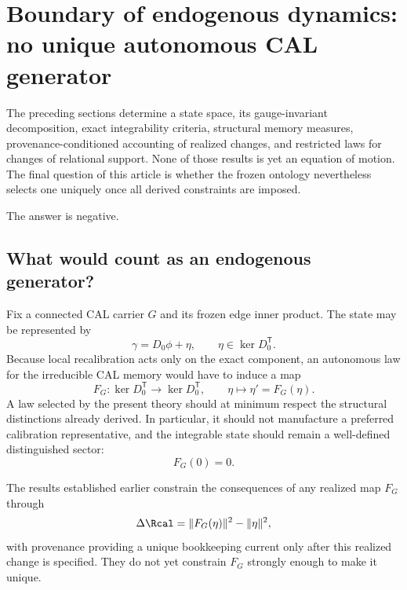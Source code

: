 
\section{Boundary of endogenous dynamics: no unique autonomous CAL generator}
\label{sec:stop}

The preceding sections determine a state space, its gauge-invariant decomposition, exact integrability criteria, structural memory measures, provenance-conditioned accounting of realized changes, and restricted laws for changes of relational support. None of those results is yet an equation of motion. The final question of this article is whether the frozen ontology nevertheless selects one uniquely once all derived constraints are imposed.

The answer is negative.

\subsection{What would count as an endogenous generator?}

Fix a connected CAL carrier $G$ and its frozen edge inner product. The state may be represented by
\begin{equation}
\gamma=D_0\phi+\eta,
\qquad
\eta\in\ker D_0^{\mathsf T}.
\end{equation}
Because local recalibration acts only on the exact component, an autonomous law for the irreducible CAL memory would have to induce a map
\begin{equation}
F_G:\ker D_0^{\mathsf T}\longrightarrow\ker D_0^{\mathsf T},
\qquad
\eta\longmapsto\eta'=F_G(\eta).
\label{eq:memory-generator-map}
\end{equation}
A law selected by the present theory should at minimum respect the structural distinctions already derived. In particular, it should not manufacture a preferred calibration representative, and the integrable state should remain a well-defined distinguished sector:
\begin{equation}
F_G(0)=0.
\label{eq:integrable-fixed-point}
\end{equation}

The results established earlier constrain the consequences of any realized map $F_G$ through
\begin{equation}
\Delta\Rcal
=
\|F_G(\eta)\|^2-\|\eta\|^2,
\end{equation}
with provenance providing a unique bookkeeping current only after this realized change is specified. They do not yet constrain $F_G$ strongly enough to make it unique.


